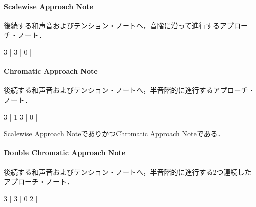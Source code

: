 \documentclass[dvipdfmx,uplatex,b5paper,openany,jbase=12Q,nomag*,textwidth-limit=44%
               ]{gachimuchi}
\begin{document}
\paragraph{Scalewise Approach Note}
後続する和声音およびテンション・ノートへ，音階に沿って進行するアプローチ・ノート．
\begin{floatMusic}[width=0.9\linewidth]
  \nostartrule%
  \Startpiece%
  \Notes
  3%
  \zcharsu{*}%
  \zcharsu{*}%
  \en\bar\NOTes%
  \en\doublebar
  \Notes
  3\zcharsu{*}%
  \zcharsu{*}%
  \en\bar\NOTesp%
  \zcharsu{*}%
  \en\Notes
  \en\doublebar
  \Notes
  0%
  \zcharsu{*}%
  \zcharsu{*}%
  \en\bar\NOTes%
  \en\setdoublebar
  \endpiece%
\end{floatMusic}
\paragraph{Chromatic Approach Note}
後続する和声音およびテンション・ノートへ，半音階的に進行するアプローチ・ノート．
\begin{floatMusic}[width=0.9\linewidth]
  \nostartrule%
  \Startpiece%
  \Notes
  3%
  \zcharsu{*}%
  \en\bar\Notes%
  \zcharsu{*}1%
  \en\NOtes
  \qp
  \en\doublebar
  \Notes
  3\zcharsu{*}%
  \zcharsu{*}%
  \en\bar\NOTesp%
  \zcharsu{*}%
  \en\Notes
  \en\doublebar
  \Notes
  0%
  \zcharsu{*}%
  \zcharsu{*}%
  \en\bar\NOTes%
  \en\setdoublebar
  \endpiece%
\end{floatMusic}
\begin{chuui}
Scalewise Approach NoteでありかつChromatic Approach Noteである．
\end{chuui}
\paragraph{Double Chromatic Approach Note}
後続する和声音およびテンション・ノートへ，半音階的に進行する2つ連続したアプローチ・ノート．
\begin{floatMusic}[width=0.9\linewidth]
  \nostartrule%
  \Startpiece%
  \Notes
  3%
  \zcharsu{*}%
  \zcharsu{*}%
  \en\bar\NOTes%
  \en\doublebar
  \Notes
  3\zcharsu{*}%
  \zcharsu{*}%
  \en\bar\Notes%
  \zcharsu{*}0%
  \zcharsu{*}%
  \en\NOtes
  \en\doublebar
  \Notes
  \ds
  2%
  \zcharsu{*}%
  \zcharsu{*}%
  \en\bar\NOTes%
  \en\setdoublebar
  \endpiece%
\end{floatMusic}
\end{document}
